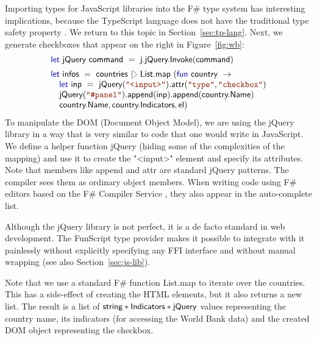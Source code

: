 \documentclass[submission,copyright,creativecommons]{eptcs}
\newcommand{\rang}{\begin{picture}(5,7)
\put(.1,2.5){\rotatebox{135}{\line(1,0){6.0}}}
\put(.1,2.5){\rotatebox{225}{\line(1,0){6.0}}}
\end{picture}}
\newcommand{\kvd}[1]{\textnormal{\textcolor{kvdclr}{\sffamily #1}}}
\newcommand{\str}[1]{\textnormal{\textcolor{strclr}{\ttfamily "#1"}}}
\newcommand{\ident}[1]{\textnormal{\sffamily #1}}
\begin{document}
Importing types for JavaScript libraries into the F\# type system has interesting implications,
because the TypeScript language does not have the traditional type safety property \cite{ms-safets}.
We return to this topic in Section~\ref{sec:tp-lang}. Next, we generate checkboxes that appear on the
right in Figure~\ref{fig:wb}:
%
\begin{equation*}
\begin{array}{lll}
 \kvd{let}~\ident{jQuery}~\ident{command}~=~\ident{j.jQuery.Invoke}(\ident{command})
 \\[0.5em]
 \kvd{let}~\ident{infos}~=~\ident{countries}~|\rang~\ident{List.map}~(\kvd{fun}~\ident{country}~\rightarrow \\
 \quad \kvd{let}~\ident{inp}~=~\ident{jQuery}(\str{<input>})\ident{.attr}(\str{type}, \str{checkbox}) \\
 \quad \ident{jQuery}(\str{\#panel})\ident{.append}(\ident{inp})\ident{.append}(\ident{country.Name}) \\
 \quad \ident{country.Name}, \ident{country.Indicators}, \ident{el}) \\
\end{array}
\end{equation*}
%
To manipulate the DOM (Document Object Model), we are using the jQuery library in a way that is
very similar to code that one would write in JavaScript. We define a helper function \ident{jQuery}
(hiding some of the complexities of the mapping) and use it to create the \str{<input>} element and
specify its attributes. Note that members like \ident{append} and \ident{attr} are standard
jQuery patterns. The compiler sees them as ordinary object members. When writing code using F\# editors
based on the F\# Compiler Service \cite{fsharp-fcs}, they also appear in the auto-complete list.

Although the jQuery library is not perfect, it is a de facto standard in web development. The
FunScript type provider makes it possible to integrate with it painlessly without explicitly
specifying any FFI interface and without manual wrapping (see also Section~\ref{sec:js-lib}).

Note that we use a standard F\# function \ident{List.map} to iterate over the countries. This has
a side-effect of creating the HTML elements, but it also returns a new list. The result is a list
of $\ident{string}\ast\ident{Indicators}\ast\ident{jQuery}$ values representing the country name,
its indicators (for accessing the World Bank data) and the created DOM object representing the
checkbox.
\end{document}
